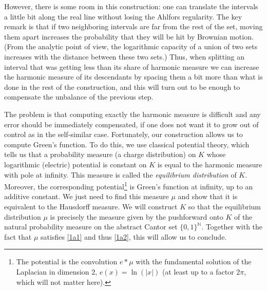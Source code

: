 \documentclass[10pt]{amsart}
\numberwithin{equation}{section}
\theoremstyle{plain}
\theoremstyle{definition}
\newcommand{\bN}{\mathbb{N}}
\begin{document}
However, there is some room in this construction: one can translate the intervals a little bit along the real
line without losing the Ahlfors regularity. The key remark is that if two neighboring intervals are far from the rest of the set,
moving them apart increases the probability that they will be hit by Brownian motion. (From the analytic point of view,
the logarithmic capacity of a union of two sets increases with the distance between these two sets.)
Thus, when splitting an interval that was getting less than its share of harmonic measure we can increase
the harmonic measure of its descendants by spacing them a bit more than what is done
in the rest of the construction, and this will turn
out to be enough to compensate the unbalance of the previous step.

The problem is that computing exactly the harmonic measure is difficult and any error should be immediately compensated,
if one does not want it to grow out of control as in the self-similar case.
Fortunately, our construction allows us to compute Green's function.
To do this, we use classical potential theory, which tells us that a probability measure (a charge distribution) on $K$
whose logarithmic (electric) potential is constant on $K$ is equal to the harmonic measure with pole at infinity.
This measure is called the \emph{equilibrium distribution} of $K$.
Moreover, the corresponding potential\footnote{The potential is the convolution $e \ast \mu$ with the fundamental solution of the Laplacian in dimension $2$, $e(x) = \ln(|x|)$ (at least up to a factor $2\pi$, which will not matter here).}
is Green's function at infinity, up to an additive constant.
We just need to find this measure $\mu$ and show that it is equivalent to the Hausdorff measure.
We will construct $K$ so that the equilibrium distribution $\mu$ is precisely the measure given by the pushforward onto $K$ of the natural probability measure on the abstract Cantor set $\{0,1\}^{\bN}$. Together with the fact that $\mu$ satisfies \eqref{1a1} and thus \eqref{1a2}, this will allow us to conclude.
\end{document}
